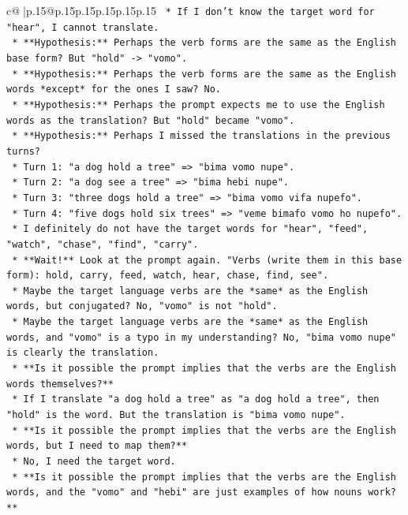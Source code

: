 \documentclass{article}
\begin{document}
{\begin{supertabular}{c@{$\;$}|p{.15\linewidth}@{}p{.15\linewidth}p{.15\linewidth}p{.15\linewidth}p{.15\linewidth}p{.15\linewidth}}
{{{\texttt{    *   If I don't know the target word for "hear", I cannot translate.} \\
\texttt{    *   **Hypothesis:** Perhaps the verb forms are the same as the English base form? But "hold" {-}> "vomo".} \\
\texttt{    *   **Hypothesis:** Perhaps the verb forms are the same as the English words *except* for the ones I saw? No.} \\
\texttt{    *   **Hypothesis:** Perhaps the prompt expects me to use the English words as the translation? But "hold" became "vomo".} \\
\texttt{    *   **Hypothesis:** Perhaps I missed the translations in the previous turns?} \\
\texttt{        *   Turn 1: "a dog hold a tree" => "bima vomo nupe".} \\
\texttt{        *   Turn 2: "a dog see a tree" => "bima hebi nupe".} \\
\texttt{        *   Turn 3: "three dogs hold a tree" => "bima vomo vifa nupefo".} \\
\texttt{        *   Turn 4: "five dogs hold six trees" => "veme bimafo vomo ho nupefo".} \\
\texttt{    *   I definitely do not have the target words for "hear", "feed", "watch", "chase", "find", "carry".} \\
\texttt{    *   **Wait!** Look at the prompt again. "Verbs (write them in this base form): hold, carry, feed, watch, hear, chase, find, see".} \\
\texttt{    *   Maybe the target language verbs are the *same* as the English words, but conjugated? No, "vomo" is not "hold".} \\
\texttt{    *   Maybe the target language verbs are the *same* as the English words, and "vomo" is a typo in my understanding? No, "bima vomo nupe" is clearly the translation.} \\
\texttt{    *   **Is it possible the prompt implies that the verbs are the English words themselves?**} \\
\texttt{        *   If I translate "a dog hold a tree" as "a dog hold a tree", then "hold" is the word. But the translation is "bima vomo nupe".} \\
\texttt{    *   **Is it possible the prompt implies that the verbs are the English words, but I need to map them?**} \\
\texttt{        *   No, I need the target word.} \\
\texttt{    *   **Is it possible the prompt implies that the verbs are the English words, and the "vomo" and "hebi" are just examples of how nouns work?**} \\
}}}
\end{supertabular}}
\end{document}
